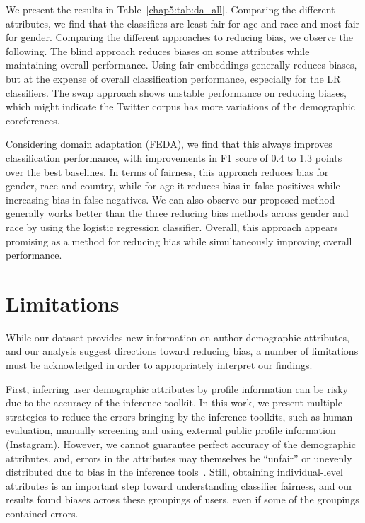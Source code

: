 We present the results in Table~\ref{chap5:tab:da_all}.
Comparing the different attributes, we find that the classifiers are least fair for age and race and most fair for gender.
Comparing the different approaches to reducing bias, we observe the following.
The blind approach reduces biases on some attributes while maintaining overall performance.
Using fair embeddings generally reduces biases, but at the expense of overall classification performance, especially for the LR classifiers.
The swap approach shows unstable performance on reducing biases, which might indicate the Twitter corpus has more variations of the demographic coreferences.


Considering domain adaptation (FEDA),
we find that this always improves classification performance,
with improvements in F1 score of 0.4 to 1.3 points over the best baselines.
In terms of fairness, this approach reduces bias for gender, race and country, while for age it reduces bias in false positives while increasing bias in false negatives.
We can also observe our proposed method generally works better than the three reducing bias methods across gender and race by using the logistic regression classifier.
Overall, this approach appears promising as a method for reducing bias while simultaneously improving overall performance.

\section{Limitations}
While our dataset provides new information on author demographic attributes, and our analysis suggest directions toward reducing bias, a number of limitations must be acknowledged in order to appropriately interpret our findings.

First, inferring user demographic attributes by profile information can be risky due to the accuracy of the inference toolkit.
In this work, we present multiple strategies to reduce the errors bringing by the inference toolkits, such as human evaluation, manually screening and using external public profile information (Instagram).
However, we cannot guarantee perfect accuracy of the demographic attributes,
and, errors in the attributes may themselves be ``unfair'' or unevenly distributed due to bias in the inference tools~\cite{buolamwini2018gender}.
Still, obtaining individual-level attributes is an important step toward understanding classifier fairness, and our results found biases across these groupings of users, even if some of the groupings contained errors.


